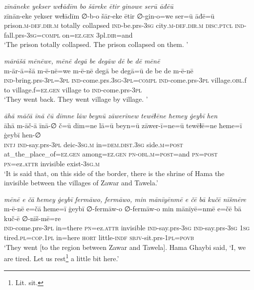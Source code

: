 \ea \label{BP.174}
\textit{zīnāneke yekser weɫādīm bo šāreke ētir ginowe serū āđēū} \\ 
\gll zīnān-eke yekser weɫādīm ∅-b-o šār-eke ētir ∅-gin-o=we ser=ū āđē=ū \\ 
 prison\textsc{.m}\textsc{-def}\textsc{.dir}\textsc{.m} totally collapsed \textsc{ind-}be.prs\textsc{-3sg} city\textsc{.m}\textsc{-def}\textsc{.dir}\textsc{.m} \textsc{disc.ptcl} \textsc{ind-}fall.prs\textsc{-3sg}\textsc{=compl} on\textsc{=ez.gen} 3pl\textsc{.dir}=and \\ 
\glt `The prison totally collapsed. The prison collapsed on them. '
\z 
 
\ea \label{BP.177}
\textit{mārāšā mēnēwe, mēnē degā be degāw dē be dē mēnē} \\ 
\gll m-ār-ā=šā m-ē-nē=we m-ē-nē degā be degā=ū de be de m-ē-nē \\ 
 \textsc{ind-}bring.prs\textsc{-3pl}\textsc{=3pl} \textsc{ind-}come.prs\textsc{.3sg}\textsc{-3pl}\textsc{=compl} \textsc{ind-}come.prs\textsc{-3pl} village\textsc{.obl}.f to village.f\textsc{=ez.gen} village to \textsc{ind-}come.prs\textsc{-3pl} \\ 
\glt `They went back. They went village by village. '
\z 
 
\ea \label{BP.178}
\textit{āhā māčā īnā čū dīmne lāw beynū zāwerīnew tewēɫēne ħemey ġeybī hen} \\ 
\gll āhā m-āč-ā īnā-∅ č=ū dīm=ne lā=ū beyn=ū zāwer-ī=ne=ū tewēɫē=ne ħeme=ī ġeybī hen-∅ \\ 
 \textsc{intj} \textsc{ind-}say.prs\textsc{-3pl} deic\textsc{-3sg}\textsc{.m} in=\textsc{dem.dist}\textsc{.3sg} side\textsc{.m}\textsc{=\textsc{post}} at\_the\_place\_of\textsc{=ez.gen} among\textsc{=ez.gen} \textsc{pn}\textsc{-obl}\textsc{.m}\textsc{=\textsc{post}}=and \textsc{pn}\textsc{=\textsc{post}} \textsc{pn}=ez.\textsc{attr} invisible exist\textsc{-3sg}\textsc{.m} \\ 
\glt `It is said that, on this side of the border, there is the shrine of Hama the invisible between the villages of Zawar and Tawela.'
\z 
 
\ea \label{BP.181}
\textit{mēnē e čā ħemey ġeybī fermāwo, fermāwo, min mānīyēnmē e čē bā kučē nīšmēre} \\ 
\gll m-ē-nē e=čā ħeme=ī ġeybī ∅-fermāw-o ∅-fermāw-o min mānīyē=nmē e=čē bā kuč-ē ∅-nīš-mē=re \\ 
 \textsc{ind-}come.prs\textsc{-3pl} in=there \textsc{pn}=ez.\textsc{attr} invisible \textsc{ind-}say.prs\textsc{-3sg} \textsc{ind-}say.prs\textsc{-3sg} \textsc{1sg} tired\textsc{.pl}\textsc{=cop}\textsc{.\textsc{1pl}} in=here \textsc{hort} little\textsc{-indf} \textsc{sbjv-}sit.prs\textsc{-\textsc{1pl}}\textsc{=\textsc{povb}} \\ 
\glt `They went [to the region between Zawar and Tawela]. Hama Ghaybi said, ‘I, we are tired. Let us rest\footnote{Lit. sit.} a little bit here.'
\z 
 
